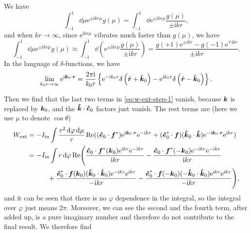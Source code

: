\documentclass[hyperref, a4paper]{article}
\newcommand*{\ii}{\mathrm{i}}
\newcommand*{\ee}{\mathrm{e}}
\begin{document}
\begin{info*}{}
    We have 
    \[
        \int_{-1}^1 \dd{\mu}  \ee^{\pm \ii k r \mu} g(\mu) 
        = \int_{-1}^1 \dd \ee^{\pm \ii k r \mu} \frac{g(\mu)}{\pm \ii k r},
    \]
    and when $kr \to \infty$, since $\ee^{\ii k r \mu}$ vibrates much faster than $g(\mu)$, we have 
    \[
        \int_{-1}^1 \dd{\mu}  \ee^{\pm \ii k r \mu} g(\mu) \approx \int_{-1}^1 \dd\left(\ee^{\pm \ii k r \mu} \frac{g(\mu)}{\pm \ii k r}\right) = \frac{g(+1) \ee^{\pm \mathrm{i} k r}-g(-1) \ee^{\mp \mathrm{i} k r}}{\pm \mathrm{i} k r}.
    \]
    In the language of $\delta$-functions, we have 
    \begin{equation}
        \lim _{k_{0} r \rightarrow \infty} \ee^{\mathrm{i} \vb*{k}_{0} \cdot \vb*{r}}=\frac{2 \pi \mathrm{i}}{k_{0} r}\left\{\ee^{-\mathrm{i} k_{0} r} \delta\left(\hat{\vb*{r}}+\hat{\vb*{k}}_{0}\right)-\ee^{\mathrm{i} k_{0} r} \delta\left(\hat{\vb*{r}}-\hat{\vb*{k}}_{0}\right)\right\}.
        \label{eq:far-kr}
    \end{equation}
\end{info*}
\noindent Then we find that the last two terms in \eqref{eq:w-ext-step-1} vanish, because $\vb*{k}$ is 
replaced by $\vb*{k}_0$, and the $\vu*{k} \cdot \vu*{e}_0$ factors just vanish. The rest terms are (here 
we use $\mu$ to denote $\cos \theta$)
\[
    \begin{aligned}
        W_\text{ext} &= - I_\text{in} \int \frac{r^2 \dd{\varphi} \dd{\mu}}{r} \Re ((\vu*{e}_0 \cdot \vb*{f}^*) \ee^{\ii \vb*{k}_0 \cdot \vb*{r}} \ee^{- \ii k r} + (\vu*{e}^*_0 \cdot \vb*{f}) (\vu*{k}_0 \cdot \vu*{k}) \ee^{- \ii \vb*{k}_0 \cdot \vb*{r}} \ee^{\ii k r}) \\
        &= - I_\text{in} \int r \dd{\varphi} \Re \Biggl( \frac{\vu*{e}_0 \cdot \vb*{f}^*(\vb*{k}_0) \ee^{\ii k r} \ee^{- \ii k r}}{\ii k r} - \frac{\vu*{e}_0 \cdot \vb*{f}^*(- \vb*{k}_0) \ee^{- \ii k r} \ee^{- \ii k r}}{\ii k r} \\
        & \quad \quad \quad + \frac{\vu*{e}_0^* \cdot \vb*{f}(\vb*{k}_0) (\vu*{k}_0 \cdot \vu*{k}_0) \ee^{- \ii k r} \ee^{\ii k r}}{- \ii k r} - \frac{\vu*{e}_0^* \cdot \vb*{f}(-\vb*{k}_0) (- \vu*{k}_0 \cdot \vu*{k}_0) \ee^{ \ii k r} \ee^{\ii k r}}{- \ii k r}  \Biggr) ,
    \end{aligned}
\]
and it can be seen that there is no $\varphi$ dependence in the integral, so the integral over $\varphi$ just means $2\pi$. Moreover, we can see the second and the fourth term, after added up, is a pure imaginary number and therefore do not contribute to the final result. We therefore find 
\end{document}
